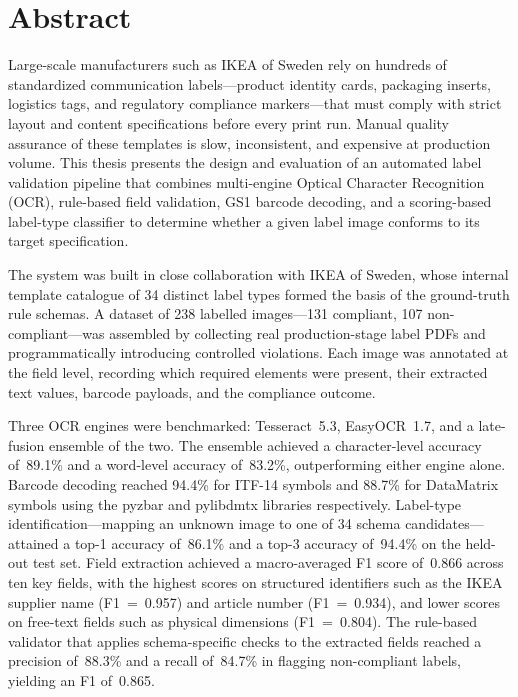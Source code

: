 \chapter*{Abstract}

Large-scale manufacturers such as IKEA of Sweden rely on hundreds of standardized communication
labels—product identity cards, packaging inserts, logistics tags, and regulatory compliance
markers—that must comply with strict layout and content specifications before every print run.
Manual quality assurance of these templates is slow, inconsistent, and expensive at production
volume. This thesis presents the design and evaluation of an automated label validation
pipeline that combines multi-engine Optical Character Recognition (\ac{OCR}), rule-based
field validation, GS1 barcode decoding, and a scoring-based label-type classifier to determine
whether a given label image conforms to its target specification.

The system was built in close collaboration with IKEA of Sweden, whose internal template
catalogue of 34 distinct label types formed the basis of the ground-truth rule schemas.
A dataset of 238 labelled images—131 compliant, 107 non-compliant—was assembled by
collecting real production-stage label PDFs and programmatically introducing controlled
violations. Each image was annotated at the field level, recording which required elements
were present, their extracted text values, barcode payloads, and the compliance outcome.

Three \ac{OCR} engines were benchmarked: Tesseract~5.3, EasyOCR~1.7, and a late-fusion
ensemble of the two. The ensemble achieved a character-level accuracy of~89.1\% and a
word-level accuracy of~83.2\%, outperforming either engine alone. Barcode decoding
reached 94.4\% for ITF-14 symbols and 88.7\% for Data\-Matrix symbols using the
pyzbar and pylibdmtx libraries respectively. Label-type identification—mapping an
unknown image to one of 34 schema candidates—attained a top-1 accuracy of~86.1\%
and a top-3 accuracy of~94.4\% on the held-out test set. Field extraction achieved
a macro-averaged F1 score of~0.866 across ten key fields, with the highest scores
on structured identifiers such as the IKEA supplier name (F1~=~0.957) and article
number (F1~=~0.934), and lower scores on free-text fields such as physical dimensions
(F1~=~0.804). The rule-based validator that applies schema-specific checks to the
extracted fields reached a precision of~88.3\% and a recall of~84.7\% in flagging
non-compliant labels, yielding an F1 of~0.865.

